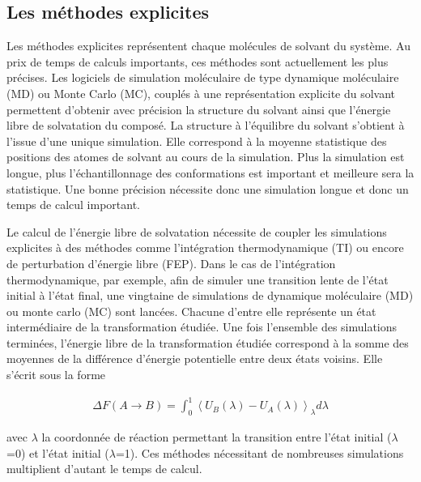 \subsection{Les méthodes explicites}
Les méthodes explicites représentent chaque molécules de solvant du système. Au prix de temps de calculs importants, ces méthodes sont actuellement les plus précises. Les logiciels de simulation moléculaire de type dynamique moléculaire (MD) ou Monte Carlo (MC), couplés à une représentation explicite du solvant permettent d'obtenir avec précision la structure du solvant ainsi que l'énergie libre de solvatation du composé. La structure à l'équilibre du solvant s'obtient à l'issue d'une unique simulation. Elle correspond à la moyenne statistique des positions des atomes de solvant au cours de la simulation. Plus la simulation est longue, plus l’échantillonnage des conformations est important et meilleure sera la statistique. Une bonne précision nécessite donc une simulation longue et donc un temps de calcul important.

Le calcul de l'énergie libre de solvatation nécessite de coupler les simulations explicites à des méthodes comme l'intégration thermodynamique (TI) ou encore de perturbation d'énergie libre (FEP)\cite{Skyner_review_2015, Hansen_Practical_2014, Christ_basic_2009}. Dans le cas de l'intégration thermodynamique, par exemple, afin de simuler une transition lente de l'état initial à l'état final, une vingtaine de simulations de dynamique moléculaire (MD) ou monte carlo (MC) sont lancées. Chacune d'entre elle représente un état intermédiaire de la transformation étudiée. Une fois l'ensemble des simulations terminées, l'énergie libre de la transformation étudiée correspond à la somme des moyennes de la différence d'énergie potentielle entre deux états voisins. Elle s'écrit sous la forme

\begin{eqnarray}
\Delta F(A \rightarrow B) =  \int_0^1 \left\langle U_B(\lambda) - U_A(\lambda) \right\rangle_{\lambda} d\lambda
\end{eqnarray}

\noindent avec $\lambda$ la coordonnée de réaction permettant la transition entre l'état initial ($\lambda$=0) et l'état initial ($\lambda$=1).
Ces méthodes nécessitant de nombreuses simulations multiplient d'autant le temps de calcul.


